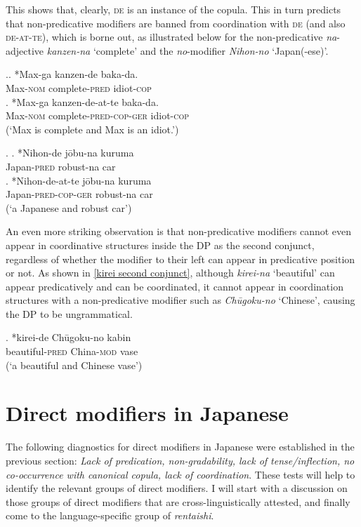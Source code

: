 \documentclass [output=book,colorlinks,citecolor=brown]{langscibook}
\begin{document}
This shows that, clearly, \textsc{de} is an instance of the copula. This in turn predicts that non-predicative modifiers are banned from coordination with \textsc{de} (and also \textsc{de-at-te}), which is borne out, as illustrated below for the non-predicative \textit{na}-adjective \textit{kanzen-na} `complete’ and the \textit{no}-modifier \textit{Nihon-no} `Japan(-ese)’. %


\ex.\ag. *Max-ga kanzen-de baka-da.\\
Max-\textsc{nom} complete-\textsc{pred} idiot-\textsc{cop}\\
\bg. *Max-ga kanzen-de-at-te baka-da.\\
Max-\textsc{nom} complete-\textsc{pred-cop-ger} idiot-\textsc{cop}\\
(`Max is complete and Max is an idiot.’)

\ex. \ag. *Nihon-de jōbu-na kuruma\\
Japan-\textsc{pred} robust-na car\\
\bg. *Nihon-de-at-te jōbu-na kuruma\\
Japan-\textsc{pred-cop-ger} robust-na car\\
(`a Japanese and robust car’)

An even more striking observation is that non-predicative modifiers cannot even appear in coordinative structures inside the DP as the second conjunct, regardless of whether the modifier to their left can appear in predicative position or not. As shown in \ref{kirei second conjunct}, although \textit{kirei-na} `beautiful’ can appear predicatively and can be coordinated, it cannot appear in coordination structures with a non-predicative modifier such as \textit{Chūgoku-no} `Chinese’, causing the DP to be ungrammatical.

\exg. *kirei-de Chūgoku-no kabin\\
beautiful-\textsc{pred} China-\textsc{mod} vase\\
(`a beautiful and Chinese vase’) \label{kirei second conjunct}

\section{Direct modifiers in Japanese}

The following diagnostics for direct modifiers in Japanese were established in the previous section: \textit{Lack of predication, non-gradability, lack of tense/inflection, no co-occurrence with canonical copula, lack of coordination}. These tests will help to identify the relevant groups of direct modifiers. I will start with a discussion on those groups of direct modifiers that are cross-linguistically attested, and finally come to the language-specific group of \textit{rentaishi}. %
\end{document}
